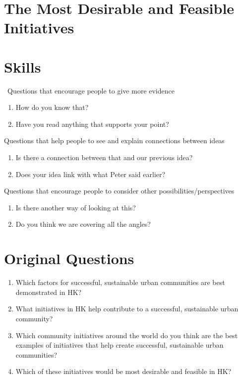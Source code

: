 \documentclass[11pt]{article}
\begin{document}
\section{The Most Desirable and Feasible Initiatives}

\newpage

\section{Skills}
\raggedright\ Questions that encourage people to give more evidence

\begin{enumerate}
\item How do you know that?
\item Have you read anything that supports your point?
\end{enumerate}


Questions that help people to see and explain connections between ideas

\begin{enumerate}
\item Is there a connection between that and our previous idea?
\item Does your idea link with what Peter said earlier? 
\end{enumerate}

Questions that encourage people to consider other possibilities/perspectives

\begin{enumerate}
\item Is there another way of looking at this?
\item Do you think we are covering all the angles?
\end{enumerate}

\section{Original Questions}
\begin{enumerate}
    \item Which factors for successful, sustainable urban communities are best demonstrated in HK?
    \item What initiatives in HK help contribute to a successful, sustainable urban community?
    \item Which community initiatives around the world do you think are the best examples of initiatives that help create successful, sustainable urban communities?
    \item Which of these initiatives would be most desirable and feasible in HK?
    
\end{enumerate}
\end{document}
